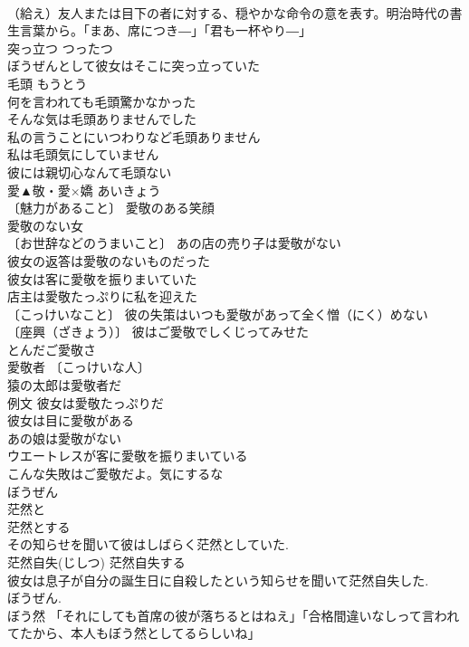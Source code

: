 \documentclass[8pt]{extreport}
\begin{document}
\begin{CJK}{UTF8}{min}
\\	（給え）友人または目下の者に対する、穏やかな命令の意を表す。明治時代の書生言葉から。「まあ、席につき―」「君も一杯やり―」
\\	突っ立つ	つったつ	
\\	ぼうぜんとして彼女はそこに突っ立っていた 
\\	毛頭	もうとう	
\\	何を言われても毛頭驚かなかった 
\\	そんな気は毛頭ありませんでした 
\\	私の言うことにいつわりなど毛頭ありません 
\\	私は毛頭気にしていません 
\\	彼には親切心なんて毛頭ない 
\\	愛▲敬・愛×嬌	あいきょう	
\\	〔魅力があること〕 愛敬のある笑顔 
\\	愛敬のない女 
\\	〔お世辞などのうまいこと〕 あの店の売り子は愛敬がない 
\\	彼女の返答は愛敬のないものだった 
\\	彼女は客に愛敬を振りまいていた 
\\	店主は愛敬たっぷりに私を迎えた 
\\	〔こっけいなこと〕 彼の失策はいつも愛敬があって全く憎（にく）めない 
\\	〔座興（ざきょう）〕 彼はご愛敬でしくじってみせた 
\\	とんだご愛敬さ 
\\	愛敬者 〔こっけいな人〕
\\	猿の太郎は愛敬者だ 
\\	例文 彼女は愛敬たっぷりだ 
\\	彼女は目に愛敬がある 
\\	あの娘は愛敬がない 
\\	ウエートレスが客に愛敬を振りまいている 
\\	こんな失敗はご愛敬だよ。気にするな 
\\	ぼうぜん		
\\	茫然と 
\\	茫然とする 
\\	その知らせを聞いて彼はしばらく茫然としていた. 
\\	茫然自失(じしつ) 茫然自失する 
\\	彼女は息子が自分の誕生日に自殺したという知らせを聞いて茫然自失した. 
\\	ぼうぜん. 
\\	ぼう然 「それにしても首席の彼が落ちるとはねえ」「合格間違いなしって言われてたから、本人もぼう然としてるらしいね」 

\end{CJK}
\end{document}
